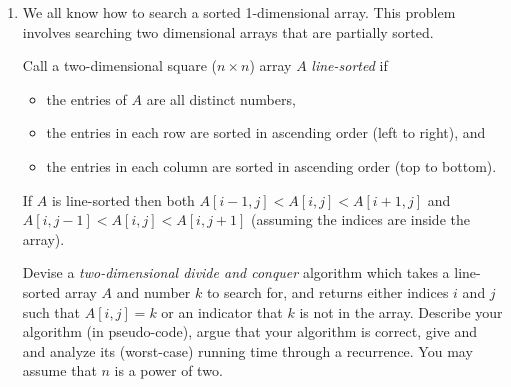 \documentclass[11pt]{article}
\theoremstyle{definition}
\newtheorem*{solution}{Solution}
\begin{document}
\begin{enumerate}
\begin{enumerate}
\begin{solution}
    than each other. These comaprisons are made in constant time so our recurrance relation is $T(n) = T(\frac{n}{2}) + \mathcal{O}(1)$. Using Master's Theorem, we can say that:
    \begin{center}
        $a$ = 1, $b$ = 2, $d$ = 0
    \end{center}  
    Using case \#2, I get $f(n) = \mathcal{O}(n^{\log_ba})$. We can then say that $T(n) \leq \mathcal{O}(n^{\log_ba}\log n)$. Plugging in the above values, I get:
    \begin{align*}
        T(n) & \leq \mathcal{O}(n^{\log_21}\log n) \\[0.7em]
        & \leq \mathcal{O}(n^{0}\log n) \\[0.7em]
        & \leq \mathcal{O}(\log n)
    \end{align*}
    Therefore, we can conclude, through the Master's Theorem, that the worst case runtime of my algorithm is $\mathcal{O}(\log n)$.
\end{solution}
\newpage
\end{enumerate}

\emph{I have read and agree to the collaboration policy.}  -- Isai Lopez Rodas, ilopezro@ucsc.edu
\\
Collaborators: None%
\\
\hrule
\item 
We all know how to search a sorted 1-dimensional array. 
This problem involves searching two dimensional arrays that are partially sorted.

Call a two-dimensional square ($n\times n$) array $A$ \emph{line-sorted} if 
\begin{itemize}
\item the entries of $A$ are all distinct numbers,
\item the entries in each row are sorted in ascending order (left to right), and 
\item the entries in each column are sorted in ascending order (top to bottom).
\end{itemize}

If $A$ is line-sorted then both
$A[i-1,j] < A[i,j] < A[i+1, j]$ and 
$A[i,j-1] < A[i,j] < A[i, j+1]$ (assuming the indices are inside the array).

Devise a \emph{two-dimensional divide and conquer} algorithm which takes a line-sorted array $A$ and 
number $k$ to search for, 
and returns either indices $i$ and $j$ such that $A[i,j] = k$  or an indicator that $k$ is not in the array.
Describe your algorithm (in pseudo-code),  
argue that your algorithm is correct, give and
and analyze its (worst-case) running time through a recurrence. 
You may assume that $n$ is a power of two.


\end{enumerate}
\end{document}
